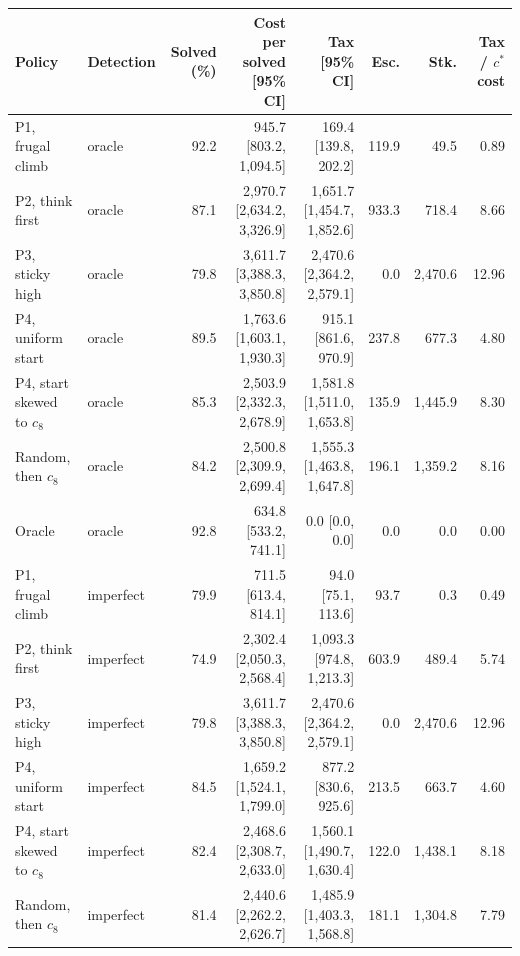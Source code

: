 \begin{tabular}{@{}llrrrrrr@{}}
\toprule
Policy & Detection & Solved (\%) & Cost per solved [95\% CI] & Tax [95\% CI] & Esc. & Stk. & Tax / $c^*$ cost \\
\midrule
P1, frugal climb & oracle & 92.2 & 945.7 [803.2, 1{,}094.5] & 169.4 [139.8, 202.2] & 119.9 & 49.5 & 0.89 \\
P2, think first & oracle & 87.1 & 2{,}970.7 [2{,}634.2, 3{,}326.9] & 1{,}651.7 [1{,}454.7, 1{,}852.6] & 933.3 & 718.4 & 8.66 \\
P3, sticky high & oracle & 79.8 & 3{,}611.7 [3{,}388.3, 3{,}850.8] & 2{,}470.6 [2{,}364.2, 2{,}579.1] & 0.0 & 2{,}470.6 & 12.96 \\
P4, uniform start & oracle & 89.5 & 1{,}763.6 [1{,}603.1, 1{,}930.3] & 915.1 [861.6, 970.9] & 237.8 & 677.3 & 4.80 \\
P4, start skewed to $c_8$ & oracle & 85.3 & 2{,}503.9 [2{,}332.3, 2{,}678.9] & 1{,}581.8 [1{,}511.0, 1{,}653.8] & 135.9 & 1{,}445.9 & 8.30 \\
Random, then $c_8$ & oracle & 84.2 & 2{,}500.8 [2{,}309.9, 2{,}699.4] & 1{,}555.3 [1{,}463.8, 1{,}647.8] & 196.1 & 1{,}359.2 & 8.16 \\
Oracle & oracle & 92.8 & 634.8 [533.2, 741.1] & 0.0 [0.0, 0.0] & 0.0 & 0.0 & 0.00 \\
\midrule
P1, frugal climb & imperfect & 79.9 & 711.5 [613.4, 814.1] & 94.0 [75.1, 113.6] & 93.7 & 0.3 & 0.49 \\
P2, think first & imperfect & 74.9 & 2{,}302.4 [2{,}050.3, 2{,}568.4] & 1{,}093.3 [974.8, 1{,}213.3] & 603.9 & 489.4 & 5.74 \\
P3, sticky high & imperfect & 79.8 & 3{,}611.7 [3{,}388.3, 3{,}850.8] & 2{,}470.6 [2{,}364.2, 2{,}579.1] & 0.0 & 2{,}470.6 & 12.96 \\
P4, uniform start & imperfect & 84.5 & 1{,}659.2 [1{,}524.1, 1{,}799.0] & 877.2 [830.6, 925.6] & 213.5 & 663.7 & 4.60 \\
P4, start skewed to $c_8$ & imperfect & 82.4 & 2{,}468.6 [2{,}308.7, 2{,}633.0] & 1{,}560.1 [1{,}490.7, 1{,}630.4] & 122.0 & 1{,}438.1 & 8.18 \\
Random, then $c_8$ & imperfect & 81.4 & 2{,}440.6 [2{,}262.2, 2{,}626.7] & 1{,}485.9 [1{,}403.3, 1{,}568.8] & 181.1 & 1{,}304.8 & 7.79 \\
\bottomrule
\end{tabular}
